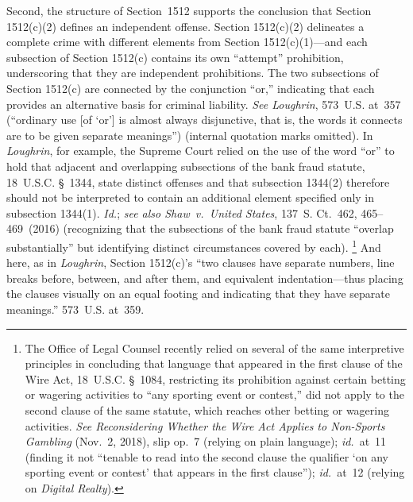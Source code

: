 Second, the structure of Section~1512 supports the conclusion that Section 1512(c)(2) defines an independent offense.
Section 1512(c)(2) delineates a complete crime with different elements from Section 1512(c)(1)---and each subsection of Section 1512(c) contains its own ``attempt'' prohibition, underscoring that they are independent prohibitions.
The two subsections of Section 1512(c) are connected by the conjunction ``or,'' indicating that each provides an alternative basis for criminal liability.
\textit{See Loughrin}, 573~U.S. at~357 (``ordinary use [of `or'] is almost always disjunctive, that is, the words it connects are to be given separate meanings'') (internal quotation marks omitted).
In \textit{Loughrin}, for example, the Supreme Court relied on the use of the word ``or'' to hold that adjacent and overlapping subsections of the bank fraud statute, 18~U.S.C. \S~1344, state distinct offenses and that subsection 1344(2) therefore should not be interpreted to contain an additional element specified only in subsection 1344(1).
\textit{Id.}; \textit{see also Shaw~v.\ United States}, 137~S. Ct.~462, 465--469~(2016) (recognizing that the subsections of the bank fraud statute ``overlap substantially'' but identifying distinct circumstances covered by each).%
\footnote{The Office of Legal Counsel recently relied on several of the same interpretive principles in concluding that language that appeared in the first clause of the Wire Act, 18~U.S.C. \S~1084, restricting its prohibition against certain betting or wagering activities to ``any sporting event or contest,'' did not apply to the second clause of the same statute, which reaches other betting or wagering activities.
\textit{See Reconsidering Whether the Wire Act Applies to Non-Sports Gambling} (Nov.~2, 2018), slip op.~7 (relying on plain language);
\textit{id.}~at~11 (finding it not ``tenable to read into the second clause the qualifier `on any sporting event or contest' that appears in the first clause'');
\textit{id.}~at~12 (relying on \textit{Digital Realty}).}
And here, as in \textit{Loughrin}, Section 1512(c)'s ``two clauses have separate numbers, line breaks before, between, and after them, and equivalent indentation---thus placing the clauses visually on an equal footing and indicating that they have separate meanings.'' 573~U.S. at~359.

